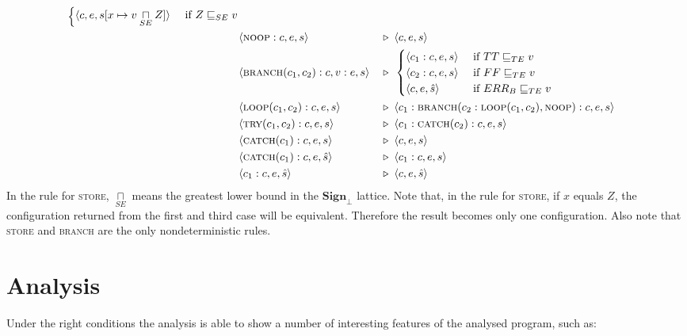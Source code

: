 \documentclass[11pt,oneside,a4paper]{article}
\newcommand{\AMIns}[1]{\textsc{#1}}
\newcommand{\AMConf}[3]{\langle #1, #2, #3 \rangle}
\newcommand{\AMArrow}{\: &\triangleright&\:\;}
\newcommand{\sign}{\textbf{Sign}_{\bot}}
\begin{document}
\begin{align*}
\begin{cases}
    \AMConf{c}{e}{s[x \mapsto v \underset{SE}{\sqcap} Z]} & 
    \text{ if } Z \sqsubseteq_{SE} v \\
 \end{cases}& \\
&\AMConf{\AMIns{noop}:c}{e}{s} \AMArrow 
 \AMConf{c}{e}{s} \\
&\AMConf{\AMIns{branch}(c_1,c_2):c}{v:e}{s} \AMArrow
 \begin{cases}
    \AMConf{c_1:c}{e}{s} & \text{ if } TT \sqsubseteq_{TE} v \\
    \AMConf{c_2:c}{e}{s} & \text{ if } FF \sqsubseteq_{TE} v \\
    \AMConf{c}{e}{\hat{s}} & \text{ if } ERR_B \sqsubseteq_{TE} v \\
 \end{cases}& \\
&\AMConf{\AMIns{loop}(c_1,c_2):c}{e}{s} \AMArrow 
 \AMConf{c_1:\AMIns{branch}(c_2:\AMIns{loop}(c_1, c_2), \AMIns{noop}):c}{e}{s}\\
&\AMConf{\AMIns{try}(c_1, c_2):c}{e}{s} \AMArrow
 \AMConf{c_1:\AMIns{catch}(c_2):c}{e}{s}& \\
&\AMConf{\AMIns{catch}(c_1):c}{e}{s} \AMArrow
 \AMConf{c}{e}{s}& \\
&\AMConf{\AMIns{catch}(c_1):c}{e}{\hat{s}} \AMArrow
 \AMConf{c_1:c}{e}{s}& \\
&\AMConf{c_1:c}{e}{\hat{s}} \AMArrow \AMConf{c}{e}{\hat{s}}
\end{align*}
In the rule for \textsc{store}, \(\underset{SE}{\sqcap}\) means the greatest 
lower bound in the \(\sign\) lattice.
Note that, in the rule for \textsc{store}, if \(x\) equals \(Z\), the 
configuration returned from the first and third case will be equivalent.
Therefore the result becomes only one configuration. Also note that
\textsc{store} and \textsc{branch} are the only nondeterministic rules.

\section*{Analysis}
  Under the right conditions the analysis is able to show a number of
  interesting features of the analysed program, such as:
\end{document}

